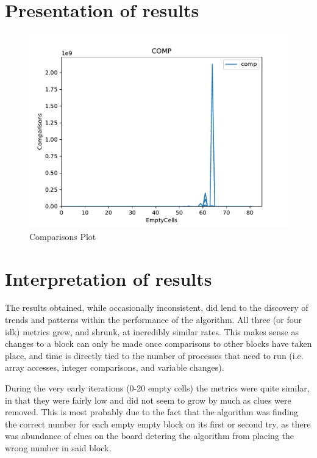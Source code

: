 \documentclass{article}
\begin{document}
    \section{Presentation of results}
    \begin{figure}[h]
        \centering
        \includegraphics[width=1\textwidth]{COMP.pdf}
        \caption{Comparisons Plot}
    \end{figure}
        

    \pagebreak 
    \section{Interpretation of results}
    The results obtained, while occasionally inconsistent, did lend to the discovery of trends and patterns within the performance of the algorithm. All three (or four idk) metrics grew, and shrunk, at incredibly similar rates. This makes sense as changes to a block can only be made once comparisons to other blocks have taken place, and time is directly tied to the number of processes that need to run (i.e. array accesses, integer comparisons, and variable changes). 


    During the very early iterations (0-20 empty cells) the metrics were quite similar, in that they were fairly low and did not seem to grow by much as clues were removed. This is most probably due to the fact that the algorithm was finding the correct number for each empty empty block on its first or second try, as there was abundance of clues on the board detering the algorithm from placing the wrong number in said block. 
\end{document}
